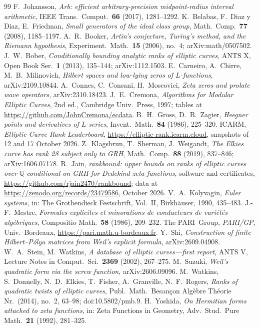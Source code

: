 \documentclass[11pt]{amsart}
\theoremstyle{remark}
\theoremstyle{definition}
\begin{document}
\begin{thebibliography}{99}
 F.~Johansson, \emph{Arb: efficient arbitrary-precision midpoint-radius interval arithmetic}, IEEE Trans.\ Comput.\ \textbf{66} (2017), 1281--1292.
 K.~Belabas, F.~Diaz y Diaz, E.~Friedman, \emph{Small generators of the ideal class group}, Math.\ Comp.\ \textbf{77} (2008), 1185--1197.
 A.~R.~Booker, \emph{Artin's conjecture, Turing's method, and the Riemann hypothesis}, Experiment.\ Math.\ \textbf{15} (2006), no.~4; arXiv:math/0507502.
 J.~W.~Bober, \emph{Conditionally bounding analytic ranks of elliptic curves}, ANTS X, Open Book Ser.\ \textbf{1} (2013), 135--144; arXiv:1112.1503.
 E.~Carneiro, A.~Chirre, M.~B.~Milinovich, \emph{Hilbert spaces and low-lying zeros of $L$-functions}, arXiv:2109.10844.
 A.~Connes, C.~Consani, H.~Moscovici, \emph{Zeta zeros and prolate wave operators}, arXiv:2310.18423.
 J.~E.~Cremona, \emph{Algorithms for Modular Elliptic Curves}, 2nd ed., Cambridge Univ.\ Press, 1997; tables at \url{https://github.com/JohnCremona/ecdata}.
 B.~H.~Gross, D.~B.~Zagier, \emph{Heegner points and derivatives of $L$-series}, Invent.\ Math.\ \textbf{84} (1986), 225--320.
 ICARM, \emph{Elliptic Curve Rank Leaderboard}, \url{https://elliptic-rank.icarm.cloud}, snapshots of 12 and 17 October 2026.
 Z.~Klagsbrun, T.~Sherman, J.~Weigandt, \emph{The Elkies curve has rank 28 subject only to GRH}, Math.\ Comp.\ \textbf{88} (2019), 837--846; arXiv:1606.07178.
 R.~Jain, \emph{rankbound: upper bounds on ranks of elliptic curves over $\mathbb Q$ conditional on GRH for Dedekind zeta functions}, software and certificates, \url{https://github.com/rjain2470/rankbound}; data at \url{https://zenodo.org/records/23479586}, October 2026.
 V.~A.~Kolyvagin, \emph{Euler systems}, in: The Grothendieck Festschrift, Vol.~II, Birkh\"auser, 1990, 435--483.
 J.-F.~Mestre, \emph{Formules explicites et minorations de conducteurs de vari\'et\'es alg\'ebriques}, Compositio Math.\ \textbf{58} (1986), 209--232.
 The PARI~Group, \emph{PARI/GP}, Univ.\ Bordeaux, \url{https://pari.math.u-bordeaux.fr}.
 Y.~Shi, \emph{Construction of finite Hilbert--P\'olya matrices from Weil's explicit formula}, arXiv:2609.04908.
 W.~A.~Stein, M.~Watkins, \emph{A database of elliptic curves---first report}, ANTS V, Lecture Notes in Comput.\ Sci.\ \textbf{2369} (2002), 267--275.
 M.~Suzuki, \emph{Weil's quadratic form via the screw function}, arXiv:2606.09096.
 M.~Watkins, S.~Donnelly, N.~D.~Elkies, T.~Fisher, A.~Granville, N.~F.~Rogers, \emph{Ranks of quadratic twists of elliptic curves}, Publ.\ Math.\ Besan\c{c}on Alg\`ebre Th\'eorie Nr.\ (2014), no.~2, 63--98; doi:10.5802/pmb.9.
 H.~Yoshida, \emph{On Hermitian forms attached to zeta functions}, in: Zeta Functions in Geometry, Adv.\ Stud.\ Pure Math.\ \textbf{21} (1992), 281--325.
\end{thebibliography}
\end{document}
